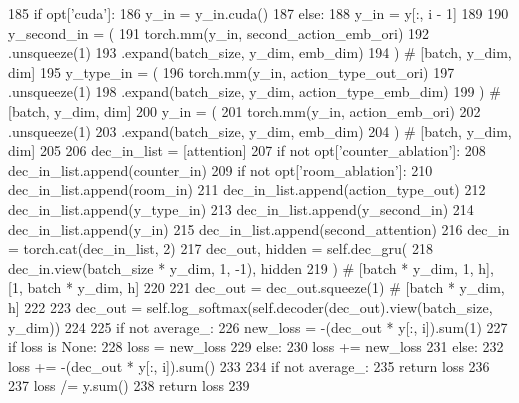 \begin{DoxyCode}
185                 \textcolor{keywordflow}{if} opt[\textcolor{stringliteral}{'cuda'}]:
186                     y\_in = y\_in.cuda()
187             \textcolor{keywordflow}{else}:
188                 y\_in = y[:, i - 1]
189 
190             y\_second\_in = (
191                 torch.mm(y\_in, second\_action\_emb\_ori)
192                 .unsqueeze(1)
193                 .expand(batch\_size, y\_dim, emb\_dim)
194             )  \textcolor{comment}{# [batch, y\_dim, dim]}
195             y\_type\_in = (
196                 torch.mm(y\_in, action\_type\_out\_ori)
197                 .unsqueeze(1)
198                 .expand(batch\_size, y\_dim, action\_type\_emb\_dim)
199             )  \textcolor{comment}{# [batch, y\_dim, dim]}
200             y\_in = (
201                 torch.mm(y\_in, action\_emb\_ori)
202                 .unsqueeze(1)
203                 .expand(batch\_size, y\_dim, emb\_dim)
204             )  \textcolor{comment}{# [batch, y\_dim, dim]}
205 
206             dec\_in\_list = [attention]
207             \textcolor{keywordflow}{if} \textcolor{keywordflow}{not} opt[\textcolor{stringliteral}{'counter\_ablation'}]:
208                 dec\_in\_list.append(counter\_in)
209             \textcolor{keywordflow}{if} \textcolor{keywordflow}{not} opt[\textcolor{stringliteral}{'room\_ablation'}]:
210                 dec\_in\_list.append(room\_in)
211             dec\_in\_list.append(action\_type\_out)
212             dec\_in\_list.append(y\_type\_in)
213             dec\_in\_list.append(y\_second\_in)
214             dec\_in\_list.append(y\_in)
215             dec\_in\_list.append(second\_attention)
216             dec\_in = torch.cat(dec\_in\_list, 2)
217             dec\_out, hidden = self.dec\_gru(
218                 dec\_in.view(batch\_size * y\_dim, 1, -1), hidden
219             )  \textcolor{comment}{# [batch * y\_dim, 1, h], [1, batch * y\_dim, h]}
220 
221             dec\_out = dec\_out.squeeze(1)  \textcolor{comment}{# [batch * y\_dim, h]}
222 
223             dec\_out = self.log\_softmax(self.decoder(dec\_out).view(batch\_size, y\_dim))
224 
225             \textcolor{keywordflow}{if} \textcolor{keywordflow}{not} average\_:
226                 new\_loss = -(dec\_out * y[:, i]).sum(1)
227                 \textcolor{keywordflow}{if} loss \textcolor{keywordflow}{is} \textcolor{keywordtype}{None}:
228                     loss = new\_loss
229                 \textcolor{keywordflow}{else}:
230                     loss += new\_loss
231             \textcolor{keywordflow}{else}:
232                 loss += -(dec\_out * y[:, i]).sum()
233 
234         \textcolor{keywordflow}{if} \textcolor{keywordflow}{not} average\_:
235             \textcolor{keywordflow}{return} loss
236 
237         loss /= y.sum()
238         \textcolor{keywordflow}{return} loss
239 
\end{DoxyCode}
